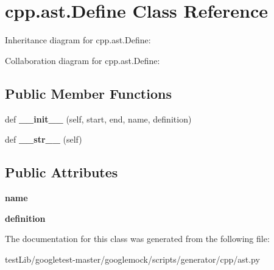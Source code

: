 \hypertarget{classcpp_1_1ast_1_1Define}{}\section{cpp.\+ast.\+Define Class Reference}
\label{classcpp_1_1ast_1_1Define}


Inheritance diagram for cpp.\+ast.\+Define\+:


Collaboration diagram for cpp.\+ast.\+Define\+:
\subsection*{Public Member Functions}
\begin{DoxyCompactItemize}
\item 
\mbox{\label{classcpp_1_1ast_1_1Define_ae9af61866e010a863ba9f8818ec8924c}} 
def {\bfseries \+\_\+\+\_\+init\+\_\+\+\_\+} (self, start, end, name, definition)
\item 
\mbox{\label{classcpp_1_1ast_1_1Define_aa89732914b19901c8d291e11f34bb627}} 
def {\bfseries \+\_\+\+\_\+str\+\_\+\+\_\+} (self)
\end{DoxyCompactItemize}
\subsection*{Public Attributes}
\begin{DoxyCompactItemize}
\item 
\mbox{\label{classcpp_1_1ast_1_1Define_a8879216f09e88f79d7baa49bcfa10ebd}} 
{\bfseries name}
\item 
\mbox{\label{classcpp_1_1ast_1_1Define_a0c636652dfeb2f15e62793afea1153c9}} 
{\bfseries definition}
\end{DoxyCompactItemize}


The documentation for this class was generated from the following file\+:\begin{DoxyCompactItemize}
\item 
test\+Lib/googletest-\/master/googlemock/scripts/generator/cpp/ast.\+py\end{DoxyCompactItemize}
